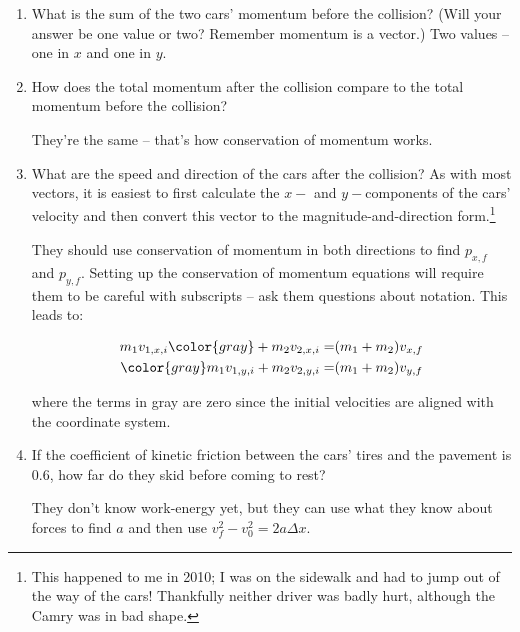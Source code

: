 \documentclass[12pt]{article}
\begin{document}
\begin{enumerate}
		\vspace{2in}
		
		
		\begin{enumerate}
			\item What is the sum of the two cars' momentum before the collision? (Will your answer be one value or two? Remember momentum is a vector.)
{\color{red} Two values -- one in $x$ and one in $y$.}
			\item How does the total momentum after the collision compare to the total momentum before the collision?
			
			{\color{red} They're the same -- that's how conservation of momentum works.}
			\newpage
			
			\vspace{2.5in}
			\item{What are the speed and direction of the cars after the collision? As with most vectors, it is easiest to first calculate the $x-$ and $y-$components of the cars' velocity and then convert this vector to the magnitude-and-direction form.\footnote{This happened to me in 2010; I was on the sidewalk and had to jump out of the way of the cars! Thankfully neither driver was badly hurt, although the Camry was in bad shape.}}
			
						{\color{red} They should use conservation of momentum in both directions to find $p_{x,f}$ and $p_{y,f}$. Setting up the conservation of momentum equations will require them to be careful with subscripts -- ask them questions about notation. This leads to:
						
		\begin{align*}
			m_1 v_{1,x,i} {\color{gray} + m_2 v_{2,x,i}} =& (m_1 + m_2) v_{x,f} \\
			{\color{gray}m_1 v_{1,y,i}} + m_2 v_{2,y,i} =& (m_1 + m_2) v_{y,f} \\
		\end{align*}			
				
			
			where the terms in gray are zero since the initial velocities are aligned with the coordinate system.
			
		}
						
			
			
	
			
			\item{If the coefficient of kinetic friction between the cars' tires and the pavement is 0.6, how far do they skid before coming to rest?}
			
						{\color{red} They don't know work-energy yet, but they can use what they know about forces to find $a$ and then use $v_f^2 - v_0^2 = 2a\Delta x$.}
			\vfill
		

\end{enumerate}
\end{enumerate}
\end{document}
